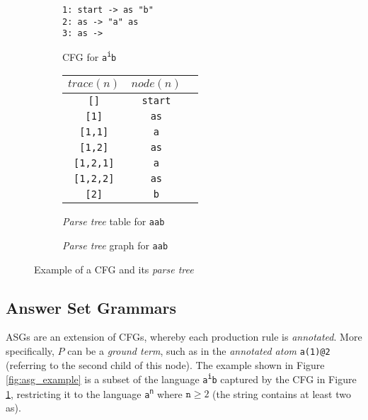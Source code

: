 \begin{figure}[H]
\begin{subfigure}{0.3\textwidth}
\texttt{1: start -> as "b" \\ 2: as -> "a" as \\ 3: as ->\\}
\caption{CFG for \texttt{a\textsuperscript{i}b}}
\end{subfigure}
\begin{subfigure}{0.34\textwidth}
\centering
\begin{table}[H]
\begin{tabular}{@{}ccc@{}}
\toprule
\textbf{$trace(n)$} & \textbf{$node(n)$} \\ \midrule
\texttt{[]} & \texttt{start} \\
\texttt{[1]} & \texttt{as} \\
\texttt{[1,1]} & \texttt{a} \\
\texttt{[1,2]} & \texttt{as} \\
\texttt{[1,2,1]} & \texttt{a} \\
\texttt{[1,2,2]} & \texttt{as} \\
\texttt{[2]} & \texttt{b} \\ \bottomrule
\end{tabular}
\end{table}
\caption{\textit{Parse tree} table for \texttt{aab}}
\end{subfigure}
\begin{subfigure}{0.34\textwidth}
\centering
{}
\caption{\textit{Parse tree} graph for \texttt{aab}}
\end{subfigure}
\caption{Example of a CFG and its \textit{parse tree}}
\label{fig:cfg_parse_tree_example}
\end{figure}

\subsection{Answer Set Grammars}

ASGs are an extension of CFGs, whereby each production rule is \textit{annotated}. More specifically, $P$ can be a \textit{ground term}, such as in the \textit{annotated atom} \texttt{a(1)@2} (referring to the second child of this node). The example shown in Figure \ref{fig:asg_example} is a subset of the language \texttt{a\textsuperscript{i}b} captured by the CFG in Figure \ref{fig:cfg_parse_tree_example},  restricting it to the language \texttt{a\textsuperscript{n}} where $\texttt{n} \ge 2$ (the string contains at least two as).

